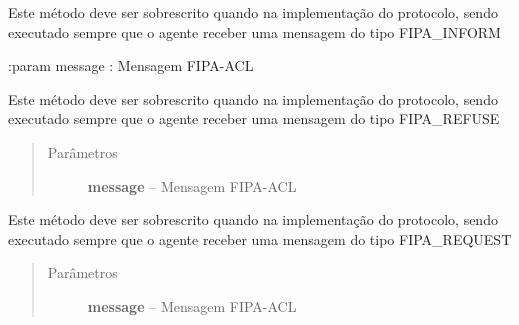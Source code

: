 \documentclass[letterpaper,10pt,brazil]{sphinxmanual}
\begin{document}
\begin{fulllineitems}
\begin{fulllineitems}
\begin{quote}
\begin{description}
\end{description}\end{quote}

\end{fulllineitems}


\begin{fulllineitems}
\label{api:pade.behaviours.protocols.FipaRequestProtocol.handle_inform}
Este método deve ser sobrescrito quando na implementação
do protocolo, sendo executado sempre que o agente receber
uma mensagem do tipo FIPA\_INFORM

:param message : Mensagem FIPA-ACL

\end{fulllineitems}


\begin{fulllineitems}
\label{api:pade.behaviours.protocols.FipaRequestProtocol.handle_refuse}
Este método deve ser sobrescrito quando na implementação
do protocolo, sendo executado sempre que o agente receber
uma mensagem do tipo FIPA\_REFUSE
\begin{quote}\begin{description}
\item[{Parâmetros}] \leavevmode
\textbf{message} -- Mensagem FIPA-ACL

\end{description}\end{quote}

\end{fulllineitems}


\begin{fulllineitems}
\label{api:pade.behaviours.protocols.FipaRequestProtocol.handle_request}
Este método deve ser sobrescrito quando na implementação
do protocolo, sendo executado sempre que o agente receber
uma mensagem do tipo FIPA\_REQUEST
\begin{quote}\begin{description}
\item[{Parâmetros}] \leavevmode
\textbf{message} -- Mensagem FIPA-ACL


\end{description}
\end{quote}
\end{fulllineitems}
\end{fulllineitems}
\end{document}
